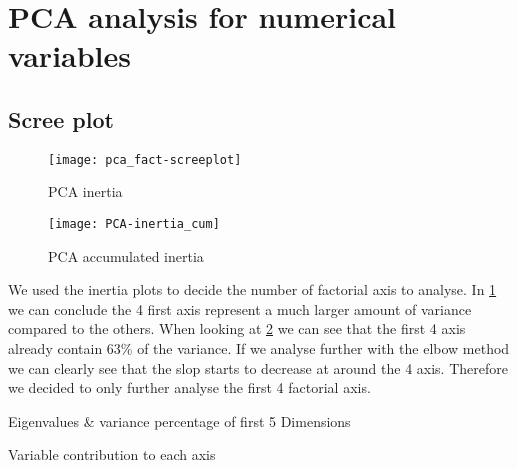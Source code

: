 

\section{PCA analysis for numerical variables}%
\label{sec:pca_analysis_for_numerical_variables}

\subsection{Scree plot}%
\label{sub:scree_plot}


\begin{figure}[H]
    \centering
    \texttt{[image: pca\_fact-screeplot]} %
    \caption{PCA inertia}%
    \label{fig:pca_inertia}
\end{figure}

\begin{figure}[H]
    \centering
    \texttt{[image: PCA-inertia\_cum]}
    \caption{PCA accumulated inertia}%
    \label{fig:pca_inertia_cum}
\end{figure}

\vspace{-1em}
We used the inertia plots to decide the number of factorial axis to analyse. In
\cref{fig:pca_inertia} we can conclude the 4 first axis represent a much
larger amount of variance compared to the others. When looking at
\cref{fig:pca_inertia_cum} we can see that the first 4 axis already contain 63\%
of the variance. If we analyse further with the elbow method we can clearly see
that the slop starts to decrease at around the 4 axis. Therefore we decided to
only further analyse the first 4 factorial axis.


\begin{table}[H]
    \centering
    \caption{Eigenvalues \& variance percentage of first 5 Dimensions}%
    \label{tab:eig}
    
\end{table}

\begin{table}[H]
    \centering
    \caption{Variable contribution to each axis}%
    \label{tab:}
    
\end{table}

